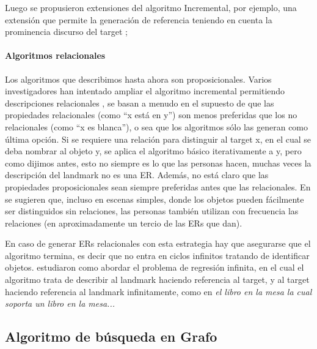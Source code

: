 Luego se propusieron extensiones del algoritmo Incremental, por ejemplo, una extensi\'on que permite la generaci\'on de referencia teniendo 
en cuenta la prominencia discurso del target \cite{Krahmer:2010:EMN:1880370,krahmer}; 

\paragraph{Algoritmos relacionales}

Los algoritmos que describimos hasta ahora son proposicionales. Varios investigadores han intentado ampliar el algoritmo incremental permitiendo descripciones relacionales
\cite{Horacek1997,krahmer,kelleher06:increm}, se basan a menudo
en el supuesto de que las propiedades relacionales (como ``x est\'a en y'') son menos preferidas que
los no relacionales (como ``x es blanca''), o sea que los algoritmos s\'olo las generan como \'ultima opci\'on. Si se requiere una relaci\'on para distinguir al target
x, en el cual se deba nombrar al objeto y, se aplica el algoritmo b\'asico iterativamente a y, pero como dijimos antes, esto no siempre es lo que las personas hacen, muchas veces la descripci\'on del landmark no es una ER. Adem\'as, no est\'a claro que las propiedades proposicionales sean siempre preferidas antes que las relacionales. En \cite{viet:gene11} se sugieren que, incluso en escenas simples, donde los objetos pueden f\'acilmente ser distinguidos
sin relaciones, las personas tambi\'en utilizan con frecuencia las relaciones (en aproximadamente un tercio de las ERs que dan).

En caso de generar ERs relacionales con esta estrategia hay que asegurarse que el algoritmo termina, es decir que no entra en ciclos infinitos 
tratando de identificar objetos. \cite{haddock} estudiaron como abordar el problema de regresi\'on infinita, en el cual el algoritmo trata de describir al landmark haciendo referencia al target, y al target haciendo referencia al landmark infinitamente, como en {\it el libro en la mesa la cual soporta un libro en la mesa... }


\subsection{Algoritmo de b\'usqueda en Grafo}
\label{graph}

%


